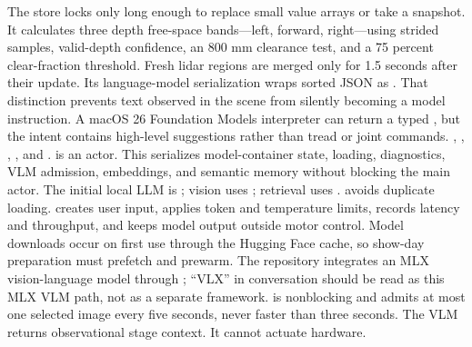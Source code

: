 {}The store locks only long enough to replace small value arrays or take a snapshot. It calculates three depth free-space bands—left, forward, right—using strided samples, valid-depth confidence, an 800 mm clearance test, and a 75 percent clear-fraction threshold. Fresh lidar regions are merged only for 1.5 seconds after their update.\markdownRendererParagraphSeparator
{}Its language-model serialization wraps sorted JSON as . That distinction prevents text observed in the scene from silently becoming a model instruction. A macOS 26 Foundation Models interpreter can return a typed , but the intent contains high-level suggestions rather than tread or joint commands.\markdownRendererInterblockSeparator
{}
\markdownRendererSectionEnd \markdownRendererSectionBegin
{}\markdownRendererInterblockSeparator
{}\markdownRendererBlockQuoteBegin
{} , , , , and .\markdownRendererBlockQuoteEnd \markdownRendererInterblockSeparator
{} is an actor. This serializes model-container state, loading, diagnostics, VLM admission, embeddings, and semantic memory without blocking the main actor. The initial local LLM is ; vision uses ; retrieval uses .\markdownRendererParagraphSeparator
{} avoids duplicate loading.  creates user input, applies token and temperature limits, records latency and throughput, and keeps model output outside motor control. Model downloads occur on first use through the Hugging Face cache, so show-day preparation must prefetch and prewarm.\markdownRendererInterblockSeparator
{}\markdownRendererSectionBegin
{}\markdownRendererInterblockSeparator
{}The repository integrates an MLX vision-language model through ; “VLX” in conversation should be read as this MLX VLM path, not as a separate framework.  is nonblocking and admits at most one selected image every five seconds, never faster than three seconds. The VLM returns observational stage context. It cannot actuate hardware.\markdownRendererParagraphSeparator
